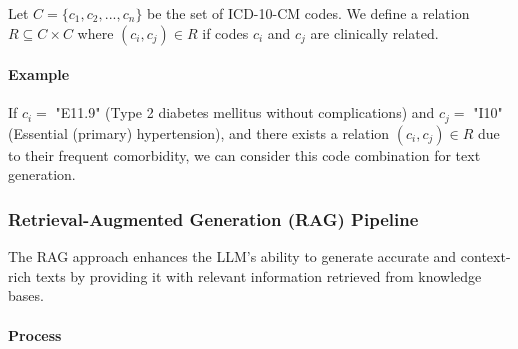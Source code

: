 \documentclass[12pt, a4paper]{article}
\begin{document}
Let \( C = \{c_1, c_2, ..., c_n\} \) be the set of ICD-10-CM codes. We define a relation \( R \subseteq C \times C \) where \( (c_i, c_j) \in R \) if codes \( c_i \) and \( c_j \) are clinically related.

\paragraph{Example}

If \( c_i = \) "E11.9" (Type 2 diabetes mellitus without complications) and \( c_j = \) "I10" (Essential (primary) hypertension), and there exists a relation \( (c_i, c_j) \in R \) due to their frequent comorbidity, we can consider this code combination for text generation.

\subsubsection{Retrieval-Augmented Generation (RAG) Pipeline}

The RAG approach enhances the LLM's ability to generate accurate and context-rich texts by providing it with relevant information retrieved from knowledge bases.

\paragraph{Process}
\end{document}
